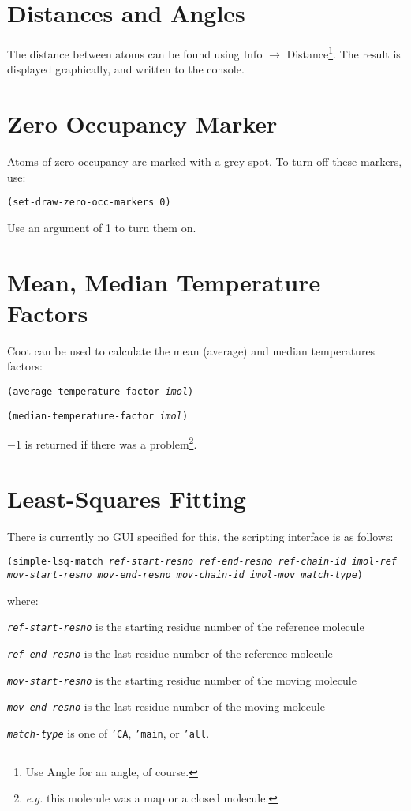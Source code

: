 \documentclass{book}
\begin{document}
\section{Distances and Angles}
The distance between atoms can be found using \textsf{Info
  $\rightarrow$ Distance}\footnote{Use \textsf{Angle} for an angle, of
  course.}.  The result is displayed graphically, and written to the
console.

\section{Zero Occupancy Marker}
Atoms of zero occupancy are marked with a grey
spot. To turn off these markers, use:

\texttt{(set-draw-zero-occ-markers 0)}

Use an argument of 1 to turn them on.

\section{Mean, Median Temperature Factors}
Coot can be used to calculate the mean (average)
and median temperatures factors:

\texttt{(average-temperature-factor \emph{imol})}

\texttt{(median-temperature-factor \emph{imol})}

$-1$ is returned if there was a problem\footnote{\emph{e.g.} this
  molecule was a map or a closed molecule.}.

\section{Least-Squares Fitting}
There is currently no GUI specified for this, the scripting interface
is as follows:

\texttt{(simple-lsq-match \emph{ref-start-resno ref-end-resno ref-chain-id imol-ref
           mov-start-resno mov-end-resno mov-chain-id imol-mov
           match-type})}

where:
\begin{trivlist}
\item \texttt{\emph{ref-start-resno}} is the starting residue number
  of the reference molecule
\item \texttt{\emph{ref-end-resno}} is the last residue number
  of the reference molecule
\item \texttt{\emph{mov-start-resno}} is the starting residue number
  of the moving molecule
\item \texttt{\emph{mov-end-resno}} is the last residue number
  of the moving molecule
\item \texttt{\emph{match-type}} is one of \texttt{'CA},
  \texttt{'main}, or \texttt{'all}.
\end{trivlist}
\end{document}
